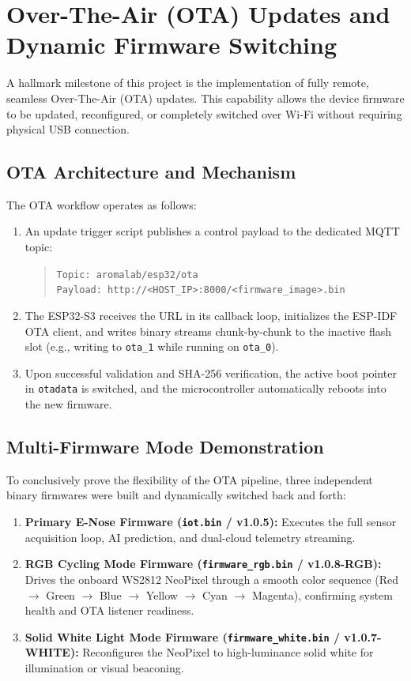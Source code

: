 ﻿\documentclass[12pt,a4paper]{article}
\begin{document}
\section{Over-The-Air (OTA) Updates and Dynamic Firmware Switching}

A hallmark milestone of this project is the implementation of fully remote, seamless Over-The-Air (OTA) updates. This capability allows the device firmware to be updated, reconfigured, or completely switched over Wi-Fi without requiring physical USB connection.

\subsection{OTA Architecture and Mechanism}
The OTA workflow operates as follows:
\begin{enumerate}
    \item An update trigger script publishes a control payload to the dedicated MQTT topic:
    \begin{quote}
        \texttt{Topic: aromalab/esp32/ota} \\
        \texttt{Payload: http://<HOST\_IP>:8000/<firmware\_image>.bin}
    \end{quote}
    \item The ESP32-S3 receives the URL in its callback loop, initializes the ESP-IDF OTA client, and writes binary streams chunk-by-chunk to the inactive flash slot (e.g., writing to \texttt{ota\_1} while running on \texttt{ota\_0}).
    \item Upon successful validation and SHA-256 verification, the active boot pointer in \texttt{otadata} is switched, and the microcontroller automatically reboots into the new firmware.
\end{enumerate}

\subsection{Multi-Firmware Mode Demonstration}
To conclusively prove the flexibility of the OTA pipeline, three independent binary firmwares were built and dynamically switched back and forth:
\begin{enumerate}
    \item \textbf{Primary E-Nose Firmware (\texttt{iot.bin} / v1.0.5):} Executes the full sensor acquisition loop, AI prediction, and dual-cloud telemetry streaming.
    \item \textbf{RGB Cycling Mode Firmware (\texttt{firmware\_rgb.bin} / v1.0.8-RGB):} Drives the onboard WS2812 NeoPixel through a smooth color sequence (Red $\rightarrow$ Green $\rightarrow$ Blue $\rightarrow$ Yellow $\rightarrow$ Cyan $\rightarrow$ Magenta), confirming system health and OTA listener readiness.
    \item \textbf{Solid White Light Mode Firmware (\texttt{firmware\_white.bin} / v1.0.7-WHITE):} Reconfigures the NeoPixel to high-luminance solid white for illumination or visual beaconing.
\end{enumerate}
\end{document}

